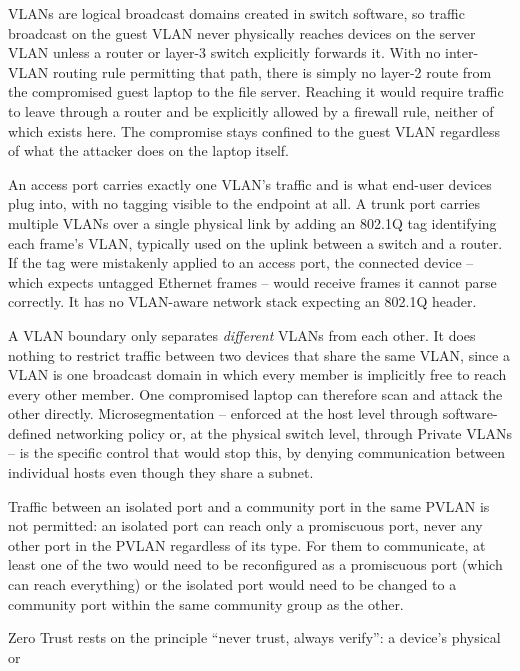 \begin{answerkey}
\item VLANs are logical broadcast domains created in switch software, so traffic broadcast on the
guest VLAN never physically reaches devices on the server VLAN unless a router or layer-3 switch
explicitly forwards it. With no inter-VLAN routing rule permitting that path, there is simply no
layer-2 route from the compromised guest laptop to the file server. Reaching it would require
traffic to leave through a router and be explicitly allowed by a firewall rule, neither of which
exists here. The compromise stays confined to the guest VLAN regardless of what the attacker does
on the laptop itself.
\item An access port carries exactly one VLAN's traffic and is what end-user devices plug into,
with no tagging visible to the endpoint at all. A trunk port carries multiple VLANs over a single
physical link by adding an 802.1Q tag identifying each frame's VLAN, typically used on the uplink
between a switch and a router. If the tag were mistakenly applied to an access port, the connected
device -- which expects untagged Ethernet frames -- would receive frames it cannot parse correctly.
It has no VLAN-aware network stack expecting an 802.1Q header.
\item A VLAN boundary only separates \emph{different} VLANs from each other. It does nothing to
restrict traffic between two devices that share the same VLAN, since a VLAN is one broadcast domain
in which every member is implicitly free to reach every other member. One compromised laptop can
therefore scan and attack the other directly. Microsegmentation -- enforced at the host level
through software-defined networking policy or, at the physical switch level, through Private VLANs
-- is the specific control that would stop this, by denying communication between individual hosts
even though they share a subnet.
\item Traffic between an isolated port and a community port in the same PVLAN is not permitted: an
isolated port can reach only a promiscuous port, never any other port in the PVLAN regardless of
its type. For them to communicate, at least one of the two would need to be reconfigured as a
promiscuous port (which can reach everything) or the isolated port would need to be changed to a
community port within the same community group as the other.
\item Zero Trust rests on the principle ``never trust, always verify'': a device's physical or

\end{answerkey}
